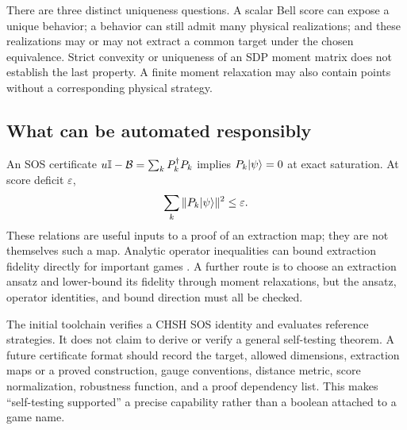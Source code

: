 There are three distinct uniqueness questions. A scalar Bell score can expose
a unique behavior; a behavior can still admit many physical realizations;
and these realizations may or may not extract a common target under the
chosen equivalence. Strict convexity or uniqueness of an SDP moment matrix
does not establish the last property. A finite moment relaxation may also
contain points without a corresponding physical strategy.

\subsection{What can be automated responsibly}
An SOS certificate $u\mathbb I-\mathcal B=\sum_kP_k^\dagger P_k$ implies
$P_k\lvert \psi\rangle=0$ at exact saturation. At score deficit $\varepsilon$,
\[
 \sum_k\|P_k\lvert \psi\rangle\|^2\leq\varepsilon.
\]
These relations are useful inputs to a proof of an extraction map; they are
not themselves such a map. Analytic operator inequalities can bound extraction
fidelity directly for important games \cite{kaniewski2016}. A further route
is to choose an extraction ansatz and lower-bound its fidelity through moment
relaxations, but the ansatz, operator identities, and bound direction must all
be checked.

The initial toolchain verifies a CHSH SOS identity and evaluates reference
strategies. It does not claim to derive or verify a general self-testing
theorem. A future certificate format should record the target, allowed
dimensions, extraction maps or a proved construction, gauge conventions,
distance metric, score normalization, robustness function, and a proof
dependency list. This makes ``self-testing supported'' a precise capability
rather than a boolean attached to a game name.
